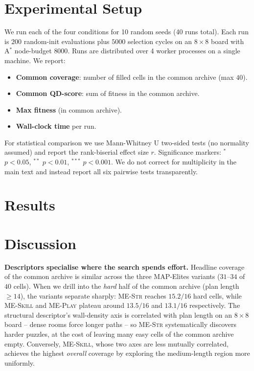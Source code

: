 \documentclass[conference]{IEEEtran}
\begin{document}
\section{Experimental Setup}
\label{sec:exp}

We run each of the four conditions for 10 random seeds (40 runs
total). Each run is $200$ random-init evaluations plus $5000$
selection cycles on an $8 \times 8$ board with A$^*$ node-budget
$8000$. Runs are distributed over 4 worker processes on a single
machine. We report:
\begin{itemize}
    \item \textbf{Common coverage}: number of filled cells in the
    common archive (max $40$).
    \item \textbf{Common QD-score}: sum of fitness in the common
    archive.
    \item \textbf{Max fitness} (in common archive).
    \item \textbf{Wall-clock time} per run.
\end{itemize}
For statistical comparison we use Mann-Whitney U two-sided tests
(no normality assumed) and report the rank-biserial effect size $r$.
Significance markers: $^*$ $p < 0.05$, $^{**}$ $p < 0.01$,
$^{***}$ $p < 0.001$. We do not correct for multiplicity in the
main text and instead report all six pairwise tests transparently.

\section{Results}
\label{sec:results}



\section{Discussion}
\label{sec:discussion}

\textbf{Descriptors specialise where the search spends effort.}
Headline coverage of the common archive is similar across the three
MAP-Elites variants ($31$--$34$ of $40$ cells). When we drill into
the \emph{hard} half of the common archive (plan length $\geq 14$),
the variants separate sharply: \textsc{ME-Str} reaches
$15.2/16$ hard cells, while \textsc{ME-Skill} and \textsc{ME-Play}
plateau around $13.5/16$ and $13.1/16$ respectively. The structural
descriptor's wall-density axis is correlated with plan length on an
$8 \times 8$ board -- dense rooms force longer paths -- so
\textsc{ME-Str} systematically discovers harder puzzles, at the
cost of leaving many easy cells of the common archive empty.
Conversely, \textsc{ME-Skill}, whose two axes are less mutually
correlated, achieves the highest \emph{overall} coverage by
exploring the medium-length region more uniformly.
\end{document}
